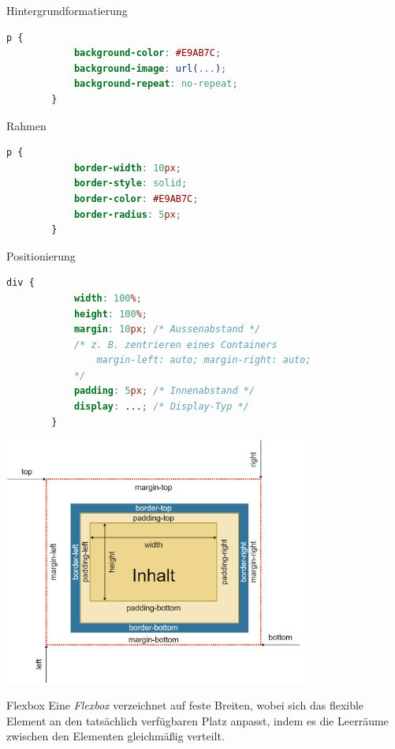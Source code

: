 \begin{bonus}{Hintergrundformatierung}
    \begin{lstlisting}[language=CSS]
        p {
            background-color: #E9AB7C;
            background-image: url(...);
            background-repeat: no-repeat;
        }
    \end{lstlisting}
\end{bonus}

\begin{bonus}{Rahmen}
    \begin{lstlisting}[language=CSS]
        p {
            border-width: 10px;
            border-style: solid;
            border-color: #E9AB7C;
            border-radius: 5px;
        }
    \end{lstlisting}
\end{bonus}

\begin{bonus}{Positionierung}
    \begin{lstlisting}[language=CSS]
        div {
            width: 100%;
            height: 100%;
            margin: 10px; /* Aussenabstand */
            /* z. B. zentrieren eines Containers
                margin-left: auto; margin-right: auto;
            */
            padding: 5px; /* Innenabstand */
            display: ...; /* Display-Typ */
        }
    \end{lstlisting}

    \begin{center}
        \includegraphics[width=0.75\textwidth]{includes/figures/bonus_css_position.png}
    \end{center}
\end{bonus}

\begin{bonus}{Flexbox}
    Eine \emph{Flexbox} verzeichnet auf feste Breiten, wobei sich das flexible Element an den tatsächlich verfügbaren Platz anpasst, indem es die Leerräume zwischen den Elementen gleichmäßig verteilt.
\end{bonus}


